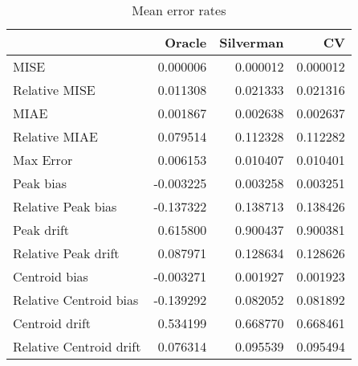 \begin{table}[ht]
\centering
\begin{tabular}{lrrr}
  \hline
 & Oracle & Silverman & CV \\ 
  \hline
MISE & 0.000006 & 0.000012 & 0.000012 \\ 
  Relative MISE & 0.011308 & 0.021333 & 0.021316 \\ 
  MIAE & 0.001867 & 0.002638 & 0.002637 \\ 
  Relative MIAE & 0.079514 & 0.112328 & 0.112282 \\ 
  Max Error & 0.006153 & 0.010407 & 0.010401 \\ 
  Peak bias & -0.003225 & 0.003258 & 0.003251 \\ 
  Relative Peak bias & -0.137322 & 0.138713 & 0.138426 \\ 
  Peak drift & 0.615800 & 0.900437 & 0.900381 \\ 
  Relative Peak drift & 0.087971 & 0.128634 & 0.128626 \\ 
  Centroid bias & -0.003271 & 0.001927 & 0.001923 \\ 
  Relative Centroid bias & -0.139292 & 0.082052 & 0.081892 \\ 
  Centroid drift & 0.534199 & 0.668770 & 0.668461 \\ 
  Relative Centroid drift & 0.076314 & 0.095539 & 0.095494 \\ 
   \hline
\end{tabular}
\caption{Mean error rates} 
\label{tbl:mean_error_rates}
\end{table}
